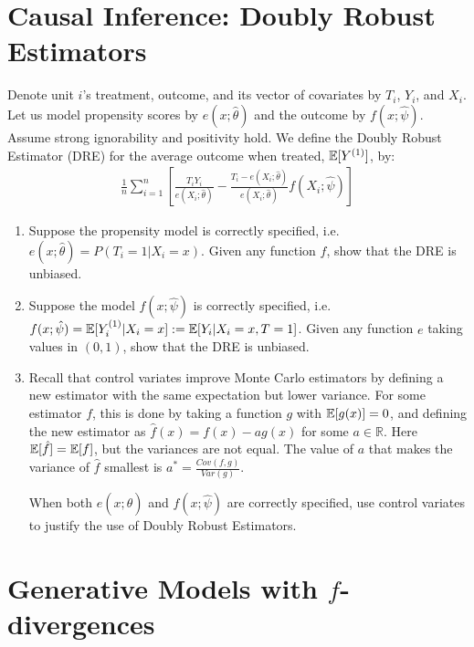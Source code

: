 \documentclass[11pt]{article}
\begin{document}
\newpage 

\section{Causal Inference: Doubly Robust Estimators}

Denote unit $i$'s treatment, outcome, and its vector of covariates by $T_i$, $Y_i$, and $X_i$. Let us model propensity scores by $e(x;\hat\theta)$ and the outcome by $f(x;\hat{\psi})$. Assume strong ignorability and positivity hold. We define the Doubly Robust Estimator (DRE) for the average outcome when treated, $\mathbb{E}[Y^{(1)}]$, by:
\begin{align}
    \frac{1}{n}\sum_{i=1}^n \left[\frac{T_iY_i}{e(X_i;\hat\theta)} - \frac{T_i - e(X_i;\hat\theta)}{e(X_i;\hat\theta)}f(X_i;\hat{\psi})\right]
\end{align}
\begin{enumerate}[label=(\Alph*)]

    \item Suppose the propensity model is correctly specified, i.e. $e(x;\hat\theta) = P(T_i=1|X_i=x)$. Given any function $f$, show that the DRE is unbiased.


    \item Suppose the model $f(x;\hat\psi)$ is correctly specified, i.e. $f(x;\hat\psi) = \mathbb{E}[Y_i^{(1)}|X_i=x] := \mathbb{E}[Y_i|X_i=x,T=1]$. Given any function $e$ taking values in $(0,1)$, show that the DRE is unbiased.


    \item Recall that control variates improve Monte Carlo estimators by defining a new estimator with the same expectation but lower variance. For some estimator $f$, this is done by taking a function $g$ with $\mathbb{E}[g(x)] = 0$, and defining the new estimator as $\hat{f}(x)=f(x) - ag(x)$ for some $a \in \mathbb{R}$. Here $\mathbb{E}[\hat{f}] =\mathbb{E}[f]$, but the variances are not equal. The value of $a$ that makes the variance of $\hat{f}$ smallest is $a^* = \frac{Cov(f,g)}{Var(g)}$.

    When both $e(x;\hat\theta)$ and $f(x;\hat\psi)$ are correctly specified, use control variates to justify the use of Doubly Robust Estimators.

\end{enumerate}

\newpage

\section{Generative Models with $f$-divergences}
\end{document}

